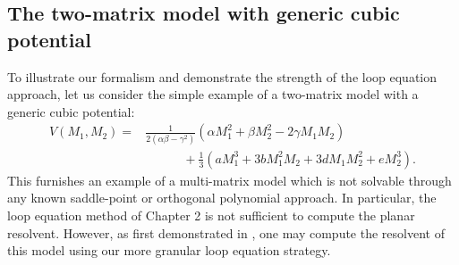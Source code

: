 \subsection{The two-matrix model with generic cubic potential}

To illustrate our formalism and demonstrate the strength of the loop equation approach, let us
consider the simple example of a two-matrix model with a generic cubic potential:
%
\begin{align}
    \label{2MMGeneric}
    V(M_1,M_2) = & \frac{1}{2(\alpha \beta - \gamma^2)}(\alpha M_1^2 + \beta M_2^2 - 2 \gamma M_1 M_2) \\
                 & \qquad \quad \nonumber + \frac{1}{3} (a M_1^3 + 3b M_1^2 M_2 + 3d M_1 M_2^2 + e M_2^3).
\end{align}
%
This furnishes an example of a multi-matrix model which is not solvable through any known
saddle-point or orthogonal polynomial approach. In particular, the loop equation method of Chapter
2 is not sufficient to compute the planar resolvent. However, as first demonstrated in
\cite{Carroll:1995nj}, one may compute the resolvent of this model using our more granular loop
equation strategy.

